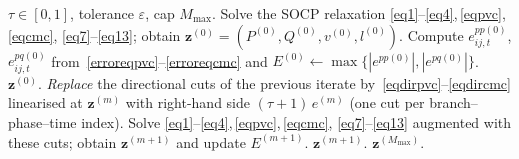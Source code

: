 
\begin{algorithm}[t]
\caption{Iterative SOCP (ISOCP).}
\label{alg:isocp}
\begin{algorithmic}[1]
\Require $\tau\!\in\![0,1]$, tolerance $\varepsilon$, cap $M_{\max}$.
\State Solve the SOCP relaxation
       \eqref{eq1}--\eqref{eq4},\,\eqref{eqpvc},\,\eqref{eqcmc},
       \eqref{eq7}--\eqref{eq13}; obtain
       $\bm{z}^{(0)}\!=\!(P^{(0)},Q^{(0)},v^{(0)},l^{(0)})$.
\State Compute $e^{pp(0)}_{ij,t}$, $e^{pq(0)}_{ij,t}$
       from~\eqref{erroreqpvc}--\eqref{erroreqcmc} and
       $E^{(0)}\!\leftarrow\!\max\{|e^{pp(0)}|,|e^{pq(0)}|\}$.
 \Return $\bm{z}^{(0)}$. \EndIf
{}
   \State \emph{Replace} the directional cuts of the previous iterate
          by~\eqref{eqdirpvc}--\eqref{eqdircmc} linearised at
          $\bm{z}^{(m)}$ with right-hand side $(\tau\!+\!1)\,e^{(m)}$
          (one cut per branch--phase--time index).
   \State Solve \eqref{eq1}--\eqref{eq4},\,\eqref{eqpvc},\,\eqref{eqcmc},
          \eqref{eq7}--\eqref{eq13} augmented with these cuts; obtain
          $\bm{z}^{(m+1)}$ and update $E^{(m+1)}$.
    \Return $\bm{z}^{(m+1)}$. \EndIf
\EndFor
\State \Return $\bm{z}^{(M_{\max})}$.
\end{algorithmic}
\end{algorithm}
